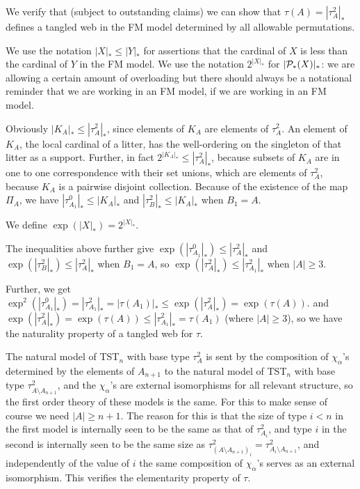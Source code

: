 \documentclass[12pt]{article}
\begin{document}
We verify that (subject to outstanding claims) we can show that $\tau(A) = |\tau^2_A|_*$ defines a tangled web in the FM model determined by all allowable permutations. 

We use the notation $|X|_* \leq |Y|_*$ for assertions that the cardinal of $X$ is less than the cardinal of $Y$ in the FM model.  We use the notation $2^{|X|_*}$ for $|{\cal P}_*(X)|_*$:  we are allowing a certain amount of overloading but there should always be a notational reminder that we are working in an FM model, if we are working in an FM model.

Obviously $|K_A|_* \leq |\tau^2_A|_*$, since elements of $K_A$ are elements of $\tau^2_A$.  An element of $K_A$, the local cardinal of a litter, has the well-ordering on the singleton of that litter
as a support.  Further, in fact $2^{|K_A|_*} \leq |\tau^2_A|_*$, because subsets of $K_A$ are in one to one correspondence with their set unions, which are elements of
$\tau^2_A$, because $K_A$ is a pairwise disjoint collection.  Because of the existence of the map $\Pi_A$, we have $|\tau^0_{A_1}|_* \leq |K_A|_*$ and
$|\tau^2_B|_* \leq |K_A|_*$ when $B_1=A$.  

We define $\exp(|X|_*) = 2^{|X|_*}$.

The inequalities above further give $\exp(|\tau^0_{A_1}|_*) \leq |\tau^2_A|_*$ and $\exp(|\tau^2_B|_*) \leq |\tau^2_A|_*$ when $B_1=A$, so $\exp(|\tau^2_{A}|_*) \leq |\tau^2_{A_1}|_*$ when $|A|\geq 3$.

Further, we get $\exp^2(|\tau^0_{A_1}|_*) = |\tau^2_{A_1}|_* = |\tau(A_1)|_* \leq \exp(|\tau^2_A|_*) = \exp(\tau(A))$.
and $\exp(|\tau^2_{A}|_*) = \exp(\tau(A)) \leq |\tau^2_{A_1}|_* = \tau(A_1)$ (where $|A| \geq 3$), so we have the naturality property of a tangled web for $\tau$.

The natural model of TST$_n$ with base type $\tau^2_A$ is sent by the composition of $\chi_\alpha$'s determined by the elements of $A_{n+1}$
to the natural model of TST$_n$ with base type $\tau^2_{A \setminus A_{n+1}}$, and the $\chi_\alpha$'s are external isomorphisms for all relevant structure, so the first order theory of these models is the same.  For this to make sense of course we need $|A| \geq  n+1$.
The reason for this is that the size of type $i<n$ in the first model is internally seen to be the same as that of $\tau^2_{A_i}$, and type $i$ in the  second is internally seen to be the same size
as  $\tau^2_{(A \setminus A_{n+1})_i} = \tau^2_{A_i \setminus A_{n+1}}$, and independently of the value of $i$ the same composition of $\chi_\alpha$'s serves as an external isomorphism.
This verifies the elementarity property of $\tau$.
\end{document}
